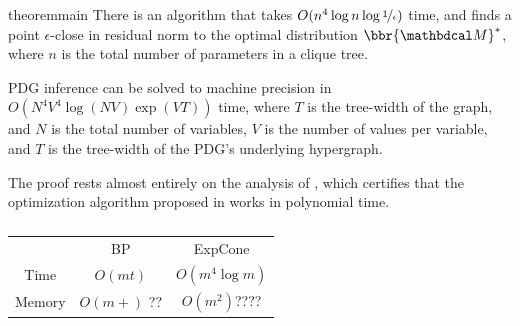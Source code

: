 \documentclass[twoside]{article}
\begin{document}

\begin{linked}{theorem}{main}
There is an algorithm that takes $O(n^4 \log n  \log \nicefrac1\epsilon )$ time,
and finds a point $\epsilon$-close in residual norm to the optimal distribution
$\bbr{\dg M}^*$, where $n$ is the total number of parameters in a clique tree.
\end{linked}

\begin{coro}
    PDG inference can be solved to machine precision in $O( N^4 V^4 \log(N V) \exp(V T) )$ time, where $T$ is the tree-width of the graph, and $N$ is the total number of variables, $V$ is the number of values per variable, and $T$ is the tree-width of the PDG's underlying hypergraph.
\end{coro}

 

The proof rests almost entirely on the analysis of \textcite{badenbroek2021algorithm},
which certifies that the optimization algorithm 
proposed in \textcite{dahl2022primal} works in polynomial time. 

\begin{table}
    \centering
    \begin{tabular}{ccc}
        \toprule
        & BP &  ExpCone \\\cmidrule(lr){2-3}
        Time & $O(m t)$ & $O( m^4 \log m )$ \\
        Memory  & $O(m + )$ {\color{red}??} & $O( m^2 )${\color{red}????}\\    \bottomrule
    \end{tabular}
    
    
    \caption{ }
\end{table}

\end{document}
